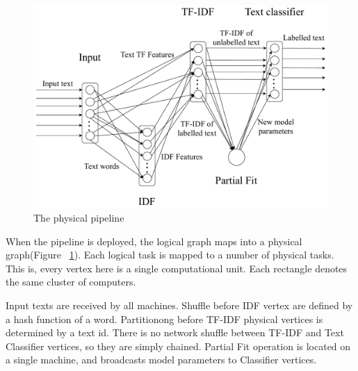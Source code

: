 \begin{figure}[htbp]
  \centering
  \includegraphics[scale=0.375]{pics/physical-graph}
  \caption{The physical pipeline}
  \label {physical_graph}
\end{figure}

When the pipeline is deployed, the logical graph maps into a physical graph(Figure ~\ref{physical_graph}). Each logical task is mapped to a number of physical tasks. This is, every vertex here is a single computational unit. Each rectangle denotes the same cluster of computers.

Input texts are received by all machines. Shuffle before IDF vertex are defined by a hash function of a word. Partitionong before TF-IDF physical vertices is determined by a text id. There is no network shuffle between TF-IDF and Text Classifier vertices, so they are simply chained. Partial Fit operation is located on a single machine, and broadcasts model parameters to Classifier vertices.


